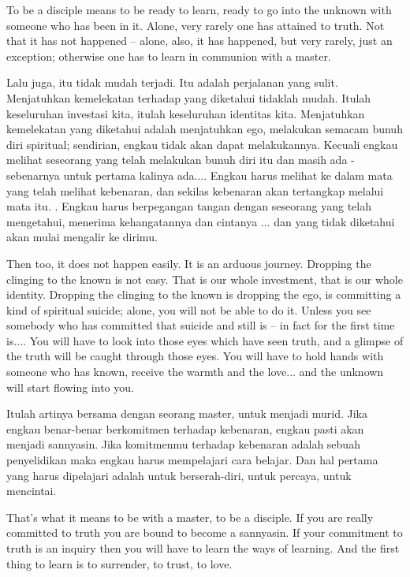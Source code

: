 \english
To be a disciple means to be ready to learn, ready to go into the unknown with someone who has been in it. Alone, very rarely one has attained to truth. Not that it has not happened -- alone, also, it has happened, but very rarely, just an exception; otherwise one has to learn in communion with a master.

\bahasa
Lalu juga, itu tidak mudah terjadi. Itu adalah perjalanan yang sulit. Menjatuhkan kemelekatan terhadap yang diketahui tidaklah mudah. Itulah keseluruhan investasi kita, itulah keseluruhan identitas kita. Menjatuhkan kemelekatan yang diketahui adalah menjatuhkan ego, melakukan semacam bunuh diri spiritual; sendirian, engkau tidak akan dapat melakukannya. Kecuali engkau melihat seseorang yang telah melakukan bunuh diri itu dan masih ada - sebenarnya untuk pertama kalinya ada.... Engkau harus melihat ke dalam mata yang telah melihat kebenaran, dan sekilas kebenaran akan tertangkap melalui mata itu. . Engkau harus berpegangan tangan dengan seseorang yang telah mengetahui, menerima kehangatannya dan cintanya ... dan yang tidak diketahui akan mulai mengalir ke dirimu.

\english
Then too, it does not happen easily. It is an arduous journey. Dropping the clinging to the known is not easy. That is our whole investment, that is our whole identity. Dropping the clinging to the known is dropping the ego, is committing a kind of spiritual suicide; alone, you will not be able to do it. Unless you see somebody who has committed that suicide and still is -- in fact for the first time is.... You will have to look into those eyes which have seen truth, and a glimpse of the truth will be caught through those eyes. You will have to hold hands with someone who has known, receive the warmth and the love... and the unknown will start flowing into you.

\bahasa
Itulah artinya bersama dengan seorang master, untuk menjadi murid. Jika engkau benar-benar berkomitmen terhadap kebenaran, engkau pasti akan menjadi sannyasin. Jika komitmenmu terhadap kebenaran adalah sebuah penyelidikan maka engkau harus mempelajari cara belajar. Dan hal pertama yang harus dipelajari adalah untuk berserah-diri, untuk percaya, untuk mencintai.

\english
That's what it means to be with a master, to be a disciple. If you are really committed to truth you are bound to become a sannyasin. If your commitment to truth is an inquiry then you will have to learn the ways of learning. And the first thing to learn is to surrender, to trust, to love.

